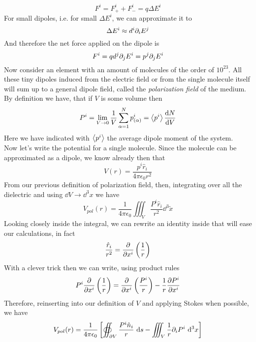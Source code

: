 \documentclass[../electromagnetism]{subfiles}
\begin{document}
\begin{equation*}
	F^i=F^i_++F^i_-=q\Delta E^i
\end{equation*}
For small dipoles, i.e. for small $\Delta E^i$, we can approximate it to
\begin{equation*}
	\Delta E^i\approx d^i\partial_iE^j
\end{equation*}
And therefore the net force applied on the dipole is
\begin{equation}
	F^i=qd^j\partial_jE^i=p^j\partial_jE^i
	\label{eq:netforcedip}
\end{equation}
Now consider an element with an amount of molecules of the order of $10^{23}$. All these tiny dipoles induced from the electric field or from the single molecule itself will sum up to a general dipole field, called the \textit{polarization field} of the medium. By definition we have, that if $V$ is some volume then
\begin{equation}
	P^i=\lim_{V\to0}\frac{1}{V}\sum_{\alpha=1}^Np_{(\alpha)}^i=\expval{p^i}\dv{N}{V}
	\label{eq:polarizationfield}
\end{equation}
Here we have indicated with $\expval{p^i}$ the average dipole moment of the system.\\
Now let's write the potential for a single molecule. Since the molecule can be approximated as a dipole, we know already then that
\begin{equation*}
	V(r)=\frac{p^i\hat{r}_i}{4\pi\epsilon_0r^2}
\end{equation*}
From our previous definition of polarization field, then, integrating over all the dielectric and using $\dd V\to\dd^3x$ we have
\begin{equation}
	V_{pol}(r)=\frac{1}{4\pi\epsilon_0}\iiint_V\frac{P^i\hat{r}_i}{r^2}\dd^3\tilde{x}
	\label{eq:polobjpot}
\end{equation}
Looking closely inside the integral, we can rewrite an identity inside that will ease our calculations, in fact
\begin{equation*}
	\frac{\hat{r}_i}{r^2}=\pdv{x^i}\left(\frac{1}{r}\right)
\end{equation*}
With a clever trick then we can write, using product rules
\begin{equation*}
	P^i\pdv{x^i}\left( \frac{1}{r} \right)=\pdv{x^i}\left( \frac{P^i}{r} \right)-\frac{1}{r}\pdv{P^i}{x^i}
\end{equation*}
Therefore, reinserting into our definition of $V$ and applying Stokes when possible, we have
\begin{equation}
	V_{pol}(r)=\frac{1}{4\pi\epsilon_0}\left[ \oiint_{\partial V}\frac{P^i\hat{n}_i}{r}\ \mathrm{d} s-\iiint_V\frac{1}{r}\partial_iP^i\ \mathrm{d}^3x \right]
	\label{eq:potdietotint}
\end{equation}
\end{document}
